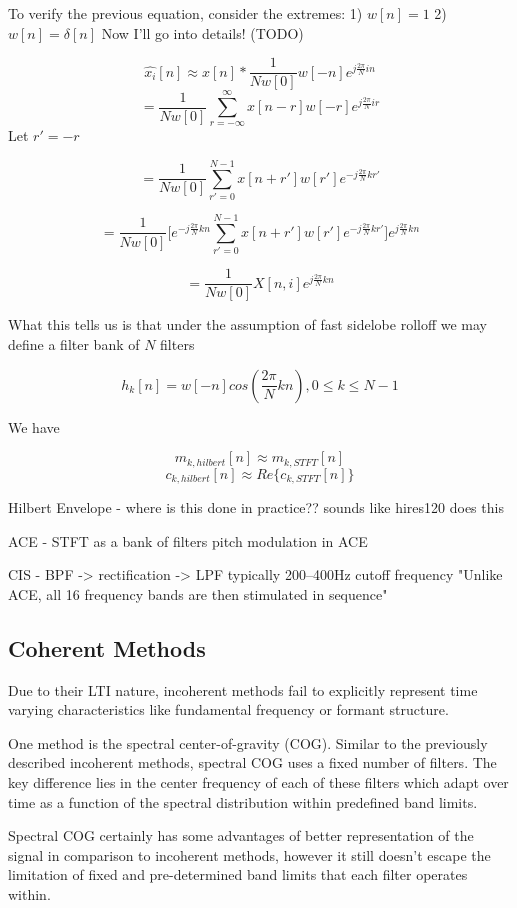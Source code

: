 \documentclass [11pt, proquest] {uwthesis}[2015/03/03]
\begin{document}
To verify the previous equation, consider the extremes:
1) $w[n] = 1$
2) $w[n] = \delta[n]$
Now I'll go into details! (TODO)

$$\widehat{x_i}[n] \approx x[n] * \frac{1}{Nw[0]}w[-n]e^{j\frac{2\pi}{N}in}$$
$$ =\frac{1}{Nw[0]}\sum\limits_{r=-\infty}^{\infty}x[n - r] w[-r] e^{j\frac{2\pi}{N}ir}$$
Let $r' = -r$

$$= \frac{1}{Nw[0]}\sum\limits_{r'=0}^{N-1} x[n + r'] w[r'] e^{-j\frac{2\pi}{N}kr'}$$


$$= \frac{1}{Nw[0]}\bigg[e^{-j\frac{2\pi}{N}kn} \sum\limits_{r'=0}^{N-1} x[n + r'] w[r'] e^{-j\frac{2\pi}{N}kr'}\bigg]e^{j\frac{2\pi}{N}kn}$$

$$ = \frac{1}{Nw[0]}X[n,i]e^{j\frac{2\pi}{N}kn}$$



What this tells us is that under the assumption of fast sidelobe rolloff we may define a filter bank of $N$ filters

$$h_k[n] = w[-n]cos(\frac{2\pi}{N}kn), 0 \leq k \leq N-1$$

We have

$$m_{k,hilbert}[n] \approx m_{k,STFT}[n]$$
$$c_{k,hilbert}[n] \approx Re\{c_{k,STFT}[n]\}$$

Hilbert Envelope - where is this done in practice??
	sounds like hires120 does this

ACE - STFT as a bank of filters
pitch modulation in ACE


CIS - BPF -> rectification -> LPF   
	typically 200–400Hz cutoff frequency
	"Unlike ACE, all 16 frequency bands are then stimulated in sequence"




\subsection{Coherent Methods}

Due to their LTI nature, incoherent methods fail to explicitly represent time varying characteristics like fundamental frequency or formant structure. \cite{wilson1993design}

One method is the spectral center-of-gravity (COG).  Similar to the previously described incoherent methods, spectral COG uses a fixed number of filters.  The key difference lies in the center frequency of each of these filters which adapt over time as a function of the spectral distribution within predefined band limits.

Spectral COG certainly has some advantages of better representation of the signal in comparison to incoherent methods, however it still doesn't escape the limitation of fixed and pre-determined band limits that each filter operates within.
\end{document}

